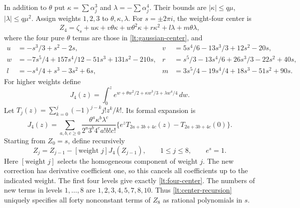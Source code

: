 In addition to $\theta$ put $\kappa=\sum\alpha_j^3$ and
$\lambda=-\sum\alpha_j^4$. Their bounds are
$|\kappa|\le q\mu$, $|\lambda|\le q\mu^2$. Assign weights
$1,2,3$ to $\theta,\kappa,\lambda$. For $s=\pm2\pi i$, the
weight-four center is
\begin{equation}\label{lt:four-center}
 Z_4=\zeta_s+u\kappa+v\theta\kappa+w\theta^2\kappa
                    +r\kappa^2+l\lambda+m\theta\lambda,
\end{equation}
where the four pure $\theta$ terms are those in
\eqref{lt:gaussian-center}, and
\begin{align*}
 u&=-s^3/3+s^2-2s,&
 v&=5s^4/6-13s^3/3+12s^2-20s,\\
 w&=-7s^5/4+157s^4/12-51s^3+131s^2-210s,&
 r&=s^5/3-13s^4/6+26s^3/3-22s^2+40s,\\
 l&=-s^4/4+s^3-3s^2+6s,&
 m&=3s^5/4-19s^4/4+18s^3-51s^2+90s.
\end{align*}
For higher weights define
\[
 J_4(z)=\int_0^ze^{w+\theta w^2/2+\kappa w^3/3+\lambda w^4/4}\,dw.
\]
Let $T_j(z)=\sum_{k=0}^j(-1)^{j-k}j!z^k/k!$. Its formal expansion is
\[
 J_4(z)=\sum_{a,b,c\ge0}
 \frac{\theta^a\kappa^b\lambda^c}{2^a3^b4^c a!b!c!}
 \{e^zT_{2a+3b+4c}(z)-T_{2a+3b+4c}(0)\}.
\]
Starting from $Z_0=s$, define recursively
\begin{equation}\label{lt:center-recursion}
 Z_j=Z_{j-1}-[\text{weight }j]J_4(Z_{j-1}),
        \qquad 1\le j\le8,\qquad e^s=1.
\end{equation}
Here $[\text{weight }j]$ selects the homogeneous component of weight $j$.
The new correction has derivative coefficient one, so this cancels
all coefficients up to the indicated weight. The first four levels
give exactly \eqref{lt:four-center}. The numbers of new terms in
levels $1,\ldots,8$ are $1,2,3,4,5,7,8,10$. Thus
\eqref{lt:center-recursion} uniquely specifies all forty nonconstant
terms of $Z_8$ as rational polynomials in $s$.

